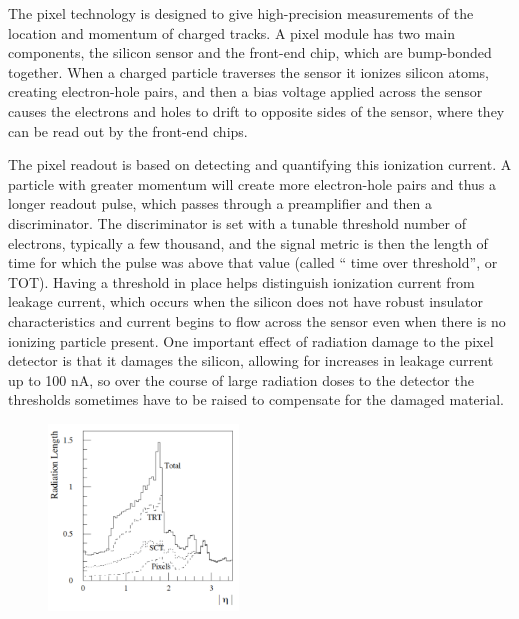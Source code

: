 The pixel technology is designed to give high-precision measurements of the location and momentum of charged tracks.  
A pixel module has two main components, the silicon sensor and the front-end chip, which are 
bump-bonded together.  When a charged particle traverses the sensor it ionizes silicon atoms, creating 
electron-hole pairs, and then a bias voltage applied across the sensor causes the electrons and holes 
to drift to opposite sides of the sensor, where they can be read out by the front-end chips.  

The pixel readout is based on detecting and quantifying this ionization current.  A particle with greater momentum will create 
more electron-hole pairs and thus a longer readout pulse, which passes through a preamplifier and then a 
discriminator.  The discriminator is set with a tunable threshold number of electrons, typically a few thousand, and 
the signal metric is then the length of time for which the pulse was above that value (called ``
time over threshold'', or TOT).  Having a threshold in place helps distinguish ionization current from leakage current, 
which occurs when the silicon does not have robust insulator characteristics and current begins to flow across the sensor even 
when there is no ionizing particle present.  One important effect of radiation damage to the pixel detector is that 
it damages the silicon, allowing for increases in leakage current up to 100 nA, so over the course 
of large radiation doses to the detector the thresholds sometimes have to be raised to compensate for the damaged material.  


\begin{figure}
  \begin{center}
	\includegraphics[width=0.45\textwidth]{ATLASDetector/images/id_material_budget.pdf}
	\label{fig:id_material}
	\end{center}
\end{figure}

